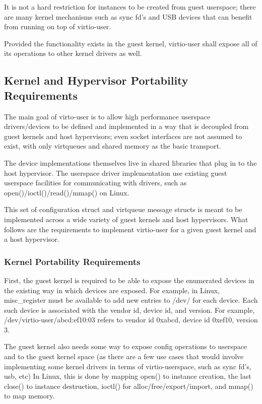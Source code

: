 It is not a hard restriction for instances to be created from guest userspace;
there are many kernel mechanisms such as sync fd's and USB devices
that can benefit from running on top of virtio-user.

Provided the functionality exists in the guest kernel, virtio-user
shall expose all of its operations to other kernel drivers as well.

\subsection{Kernel and Hypervisor Portability Requirements}\label{sec:Device Types / User Device / Kernel and Hypervisor Portability Requirements}

The main goal of virto-user is to allow high performance userspace drivers/devices
to be defined and implemented in a way that is decoupled
from guest kernels and host hypervisors;
even socket interfaces are not assumed to exist,
with only virtqueues and shared memory as the basic transport.

The device implementations themselves live in shared libraries
that plug in to the host hypervisor.
The userspace driver implementation use existing guest userspace facilities
for communicating with drivers,
such as open()/ioctl()/read()/mmap() on Linux.

This set of configuration struct and virtqueue message structs
is meant to be implemented
across a wide variety of guest kernels and host hypervisors.
What follows are the requirements to implement virtio-user
for a given guest kernel and a host hypervisor.

\subsubsection{Kernel Portability Requirements}\label{sec:Device Types / User Device / Kernel and Hypervisor Portability Requirements / Kernel Portability Requirements}

First, the guest kernel is required to be able to expose the enumerated devices
in the existing way in which devices are exposed.
For example, in Linux, misc_register must be available to add new entries
to /dev/ for each device.
Each such device is associated with the vendor id, device id, and version.
For example, /dev/virtio-user/abcd:ef10:03 refers to vendor id 0xabcd, device id 0xef10, version 3.

The guest kernel also needs some way to expose config operations to userspace
and to the guest kernel space (as there are a few use cases that would involve implementing
some kernel drivers in terms of virtio-userspace, such as sync fd's, usb, etc)
In Linux, this is done by mapping open() to instance creation,
the last close() to instance destruction,
ioctl() for alloc/free/export/import,
and mmap() to map memory.

